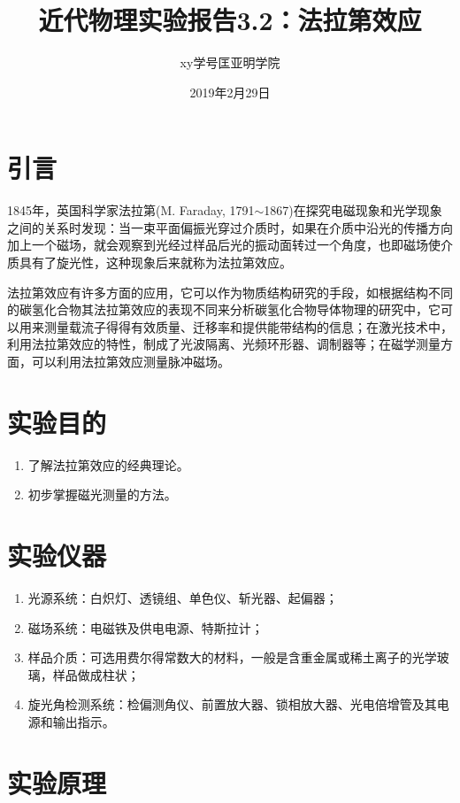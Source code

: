 \documentclass[a4paper]{article}
\title{近代物理实验报告3.2：法拉第效应}
\author{xy\quad 学号\quad 匡亚明学院}
\date{2019年2月29日}
\begin{document}
\maketitle


\section{引言}
1845年，英国科学家法拉第(M. Faraday, 1791$\sim$1867)在探究电磁现象和光学现象之间的关系时发现：当一束平面偏振光穿过介质时，如果在介质中沿光的传播方向加上一个磁场，就会观察到光经过样品后光的振动面转过一个角度，也即磁场使介质具有了旋光性，这种现象后来就称为法拉第效应。

法拉第效应有许多方面的应用，它可以作为物质结构研究的手段，如根据结构不同的碳氢化合物其法拉第效应的表现不同来分析碳氢化合物导体物理的研究中，它可以用来测量载流子得得有效质量、迁移率和提供能带结构的信息；在激光技术中，利用法拉第效应的特性，制成了光波隔离、光频环形器、调制器等；在磁学测量方面，可以利用法拉第效应测量脉冲磁场。

\section{实验目的}
\begin{enumerate}
\item 了解法拉第效应的经典理论。
\item 初步掌握磁光测量的方法。
\end{enumerate}

\section{实验仪器}
\begin{enumerate}
\item 光源系统：白炽灯、透镜组、单色仪、斩光器、起偏器；
\item 磁场系统：电磁铁及供电电源、特斯拉计；
\item 样品介质：可选用费尔得常数大的材料，一般是含重金属或稀土离子的光学玻璃，样品做成柱状；
\item 旋光角检测系统：检偏测角仪、前置放大器、锁相放大器、光电倍增管及其电源和输出指示。
\end{enumerate}

\section{实验原理}
\end{document}

